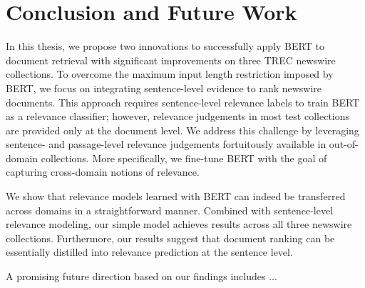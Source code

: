 \chapter{Conclusion and Future Work}
\label{ch:conclusion}

In this thesis, we propose two innovations to successfully apply BERT to document retrieval with significant improvements on three TREC newswire collections.
To overcome the maximum input length restriction imposed by BERT, we focus on integrating sentence-level evidence to rank newswire documents.
This approach requires sentence-level relevance labels to train BERT as a relevance classifier; however, relevance judgements in most test collections are provided only at the document level.
We address this challenge by leveraging sentence- and passage-level relevance judgements fortuitously available in out-of-domain collections.
More specifically, we fine-tune BERT with the goal of capturing cross-domain notions of relevance.

We show that relevance models learned with BERT can indeed be transferred across domains in a straightforward manner.
Combined with sentence-level relevance modeling, our simple model achieves  results across all three newswire collections.
Furthermore, our results suggest that document ranking can be essentially distilled into relevance prediction at the sentence level.

A promising future direction based on our findings includes ...
